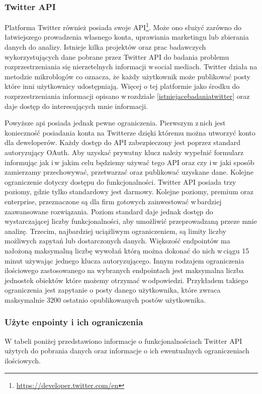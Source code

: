 \subsubsection{Twitter API}
Platforma Twitter również posiada swoje API\footnote{\url{https://developer.twitter.com/en}}. Może ono służyć zarówno do łatwiejszego prowadzenia własnego konta, uprawiania marketingu lub zbierania danych do analizy. Istnieje kilka projektów oraz prac badawczych wykorzystujących dane pobrane przez Twitter API do badania problemu rozprzestrzeniania się nierzetelnych informacji w\,social mediach\cite{marchal2019junk}\cite{gorwa2017computational}\cite{vosoughi2018spread}. Twitter działa na metodzie mikroblogów co oznacza, że każdy użytkownik może publikować posty które inni użytkownicy udostępniają. Więcej o tej platformie jako środku do rozprzestrzeniania informacji opisano w\,rozdziale \ref{istniejacebadaniatwitter} oraz daje dostęp do interesujących mnie informacji.
\par
Powyższe api posiada jednak pewne ograniczenia. Pierwszym z\,nich jest konieczność posiadania konta na Twitterze dzięki któremu można utworzyć konto dla deweloperów. Każdy dostęp do API zabezpieczony jest poprzez standard autoryzujący OAuth. Aby uzyskać prywatny klucz należy wypełnić formularz informując jak i\,w jakim celu będziemy używać tego API oraz czy i\,w jaki sposób zamierzamy przechowywać, przetwarzać oraz publikować uzyskane dane.
Kolejne ograniczenie dotyczy dostępu do funkcjonalności. Twitter API posiada trzy poziomy, gdzie tylko standardowy jest darmowy. Kolejne poziomy, premium oraz enterprise, przeznaczone są dla firm gotowych zainwestować w\,bardziej zaawansowane rozwiązania. Poziom standard daje jednak dostęp do wystarczającej liczby funkcjonalności, aby umożliwić przeprowadzaną przeze mnie analizę. 
Trzecim, najbardziej uciążliwym ograniczeniem, są limity liczby możliwych zapytań lub dostarczonych danych. Większość endpointów ma nałożoną maksymalną liczbę wywołań którą można dokonać do nich w\,ciągu 15 minut używając jednego klucza autoryzującego. Innym rodzajem ograniczenia ilościowego zastosowanego na wybranych endpointach jest maksymalna liczba jednostek obiektów które możemy otrzymać w\,odpowiedzi. Przykładem takiego ograniczenia jest zapytanie o posty danego użytkownika, które zwraca maksymalnie 3200 ostatnio opublikowanych postów użytkownika.
\subsubsection{Użyte enpointy i ich ograniczenia}
W tabeli poniżej przedstawiono informacje o funkcjonalnościach Twitter API użytych do pobrania danych oraz informacje o ich ewentualnych ograniczeniach ilościowych.  

